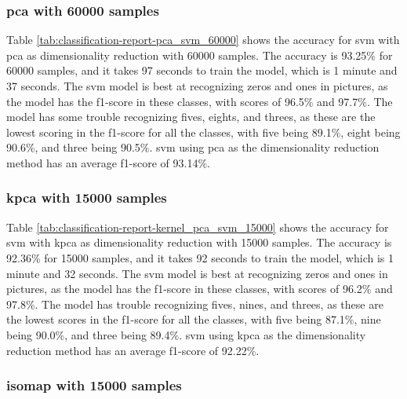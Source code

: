\subsubsection{\gls{pca} with 60000 samples}\label{subsubsec:experiment-1-results-pca-60000}

Table \ref{tab:classification-report-pca_svm_60000} shows the accuracy for \gls{svm} with \gls{pca} as dimensionality reduction with 60000 samples. The accuracy is 93.25\% for 60000 samples, and it takes 97 seconds to train the model, which is 1 minute and 37 seconds. The \gls{svm} model is best at recognizing zeros and ones in pictures, as the model has the f1-score in these classes, with scores of 96.5\% and 97.7\%. The model has some trouble recognizing fives, eights, and threes, as these are the lowest scoring in the f1-score for all the classes, with five being 89.1\%, eight being 90.6\%, and three being 90.5\%. \gls{svm} using \gls{pca} as the dimensionality reduction method has an average f1-score of 93.14\%.

\subsubsection{\gls{kpca} with 15000 samples}\label{subsubsec:experiment-1-results-kernel_pca-15000}

Table \ref{tab:classification-report-kernel_pca_svm_15000} shows the accuracy for \gls{svm} with \gls{kpca} as dimensionality reduction with 15000 samples. The accuracy is 92.36\% for 15000 samples, and it takes 92 seconds to train the model, which is 1 minute and 32 seconds. The \gls{svm} model is best at recognizing zeros and ones in pictures, as the model has the f1-score in these classes, with scores of 96.2\% and 97.8\%. The model has trouble recognizing fives, nines, and threes, as these are the lowest scores in the f1-score for all the classes, with five being 87.1\%, nine being 90.0\%, and three being 89.4\%. \gls{svm} using \gls{kpca} as the dimensionality reduction method has an average f1-score of 92.22\%.

\subsubsection{\gls{isomap} with 15000 samples}\label{subsubsec:experiment-1-results-isomap-15000}

